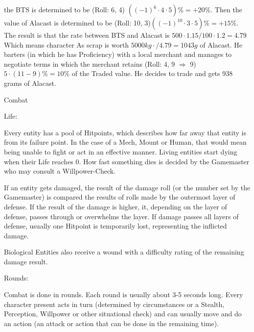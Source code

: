 \documentclass{article}
\newcommand{\subhline}[1]{\begin{center}\large #1 \normalsize \end{center}}
\begin{document}
    the BTS is determined to be (Roll: 6, 4) \(((-1)^{6}\cdot4\cdot5) \% = +20\%\). Then the value of Alacast is determined
    to be (Roll: 10, 3)\(((-1)^{10}\cdot3\cdot5) \% = +15\%\). The result is that the rate between BTS and Alacast is
    \( 500\cdot1.15/100\cdot1.2 = 4.79\) \\ Which means character As scrap is worth
    \(5000 kg\cdot / 4.79 = 1043 g \) of Alacast. He barters (in which he has Proficiency) with a local merchant and manages to
    negotiate terms in which the merchant retains (Roll: 4, 9 \(\Rightarrow\) 9) \(5\cdot(11-9)\% = 10\%\) of the Traded
    value. He decides to trade and gets 938 grams of Alacast.\newline\newline

    \subhline{Combat}

    Life:\par
    Every entity has a pool of Hitpoints, which describes how far away that entity is from its failure point.
    In the case of a Mech, Mount or Human, that would mean being unable to fight or act in an effective manner. Living
    entities start dying when their Life reaches 0. How fast something dies is decided by the Gamemaster who may consult a
    Willpower-Check.\par
    If an entity gets damaged, the result of the damage roll (or the number set by the Gamemaster) is compared the results
    of rolls made by the outermost layer of defense. If the result of the damage is higher, it, depending on the
    layer of defense, passes through or overwhelms the layer. If damage passes all layers of defense, usually one Hitpoint
    is temporarily lost, representing the inflicted damage. \par
    Biological Entities also receive a wound with a difficulty rating of the remaining damage result.\newline\newline

    Rounds:\par
    Combat is done in rounds. Each round is usually about 3-5 seconds long. Every character present acts in turn (determined
    by circumstances or a Stealth, Perception, Willpower or other situational check) and can usually move and do an action
    (an attack or action that can be done in the remaining time).\newline\newline
\end{document}
